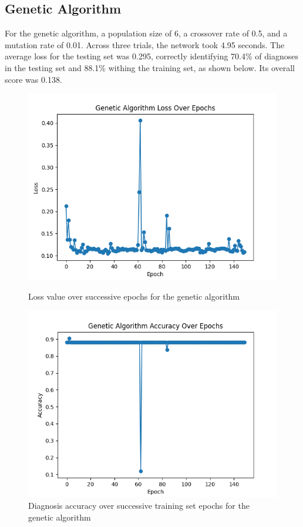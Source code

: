 \documentclass[12pt]{article}
\begin{document}
    \subsection{Genetic Algorithm}
        For the genetic algorithm, a population size of 6, a crossover rate of 0.5, and a mutation rate of 0.01.  Across three trials, the network
        took 4.95 seconds.  The average loss for the testing set was 0.295, correctly identifying 70.4\% of diagnoses in the testing set and 88.1\% withing the training set, as shown below.
        Its overall score was 0.138.
        
        \begin{figure}[h]
            \begin{minipage}{0.48\textwidth}
                \centering
                \includegraphics[width=.9\linewidth]{geneticlosses.png}
                \caption{Loss value over successive epochs for the genetic algorithm}
            \end{minipage}\hfill
            \begin{minipage}{0.48\textwidth}
                \centering
                \includegraphics[width=.9\linewidth]{geneticaccuracy.png}
                \caption{Diagnosis accuracy over successive training set epochs for the genetic algorithm}
            \end{minipage}
        \end{figure}
        
\end{document}
